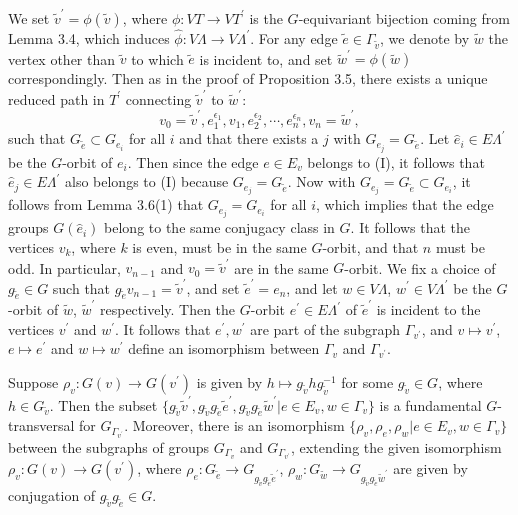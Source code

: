 \documentclass[11pt]{amsart}
\theoremstyle{plain}
\numberwithin{theorem}{section}
\theoremstyle{definition}
\begin{document}
We set $\tilde{v}^\prime=\phi(\tilde{v})$, where $\phi: VT\rightarrow VT^\prime$ is the 
$G$-equivariant bijection coming from Lemma 3.4, which induces 
$\hat{\phi}: V\Lambda\rightarrow V\Lambda^\prime$.
For any edge $\tilde{e}\in \Gamma_{\tilde{v}}$, we denote by
$\tilde{w}$ the vertex other than $\tilde{v}$ to which $\tilde{e}$ is incident to, and set 
$\tilde{w}^\prime=\phi(\tilde{w})$ correspondingly. Then as in the proof of Proposition 3.5,
there exists a unique reduced path in $T^\prime$ connecting $\tilde{v}^\prime$ to $\tilde{w}^\prime$:
$$
v_0=\tilde{v}^\prime, e_1^{\epsilon_1}, v_1, e_2^{\epsilon_2}, \cdots, e_n^{\epsilon_n}, v_n=\tilde{w}^\prime, 
$$
such that $G_{\tilde{e}}\subset G_{e_i}$ for all $i$ and that there exists a $j$ with 
$G_{e_j}=G_{\tilde{e}}$.  Let $\hat{e}_i\in E\Lambda^\prime$ be the $G$-orbit of $e_i$. 
Then since the edge $e\in E_v$ belongs to (I), it follows that $\hat{e}_j\in E\Lambda^\prime$ also belongs to (I) because $G_{e_j}=G_{\tilde{e}}$.
Now with $G_{e_j}=G_{\tilde{e}}\subset G_{e_i}$, it follows from Lemma 3.6(1) that 
$G_{e_j}=G_{e_i}$ for all $i$, which implies that the edge groups $G(\hat{e}_i)$ belong to 
the same conjugacy class in $G$.
It follows that the vertices $v_k$, where $k$ is even, must be in the same $G$-orbit, 
and that $n$ must be odd. 
In particular, $v_{n-1}$ and $v_0=\tilde{v}^\prime$ are in the same $G$-orbit. We fix a choice of 
$g_{\tilde{e}}\in G$ such that $g_{\tilde{e}}v_{n-1}=\tilde{v}^\prime$, and set $\tilde{e}^\prime=e_n$, and
let $w\in V\Lambda$, $w^\prime\in V\Lambda^\prime$ be the $G$-orbit of $\tilde{w}$, $\tilde{w}^\prime$
respectively. Then the $G$-orbit $e^\prime\in E\Lambda^\prime$ of $\tilde{e}^\prime$ is incident to the
vertices $v^\prime$ and $w^\prime$. It follows that $e^\prime, w^\prime$ are part of the subgraph 
$\Gamma_{v^\prime}$, and $v\mapsto v^\prime$, $e\mapsto e^\prime$ and $w\mapsto w^\prime$
define an isomorphism between $\Gamma_v$ and $\Gamma_{v^\prime}$.

Suppose $\rho_v: G(v)\rightarrow G(v^\prime)$ is given by 
$h\mapsto g_{\tilde{v}}h g_{\tilde{v}}^{-1}$ for some $g_{\tilde{v}}\in G$, where $h\in G_{\tilde{v}}$.
Then the subset $\{ g_{\tilde{v}} \tilde{v}^\prime, g_{\tilde{v}} g_{\tilde{e}} \tilde{e}^\prime, g_{\tilde{v}} g_{\tilde{e}} \tilde{w}^\prime|e\in E_v, w\in \Gamma_v\}$ is a fundamental  $G$-transversal for 
$G_{\Gamma_{v^\prime}}$. Moreover, there is an isomorphism 
$\{\rho_v, \rho_e,\rho_w|e\in E_v, w\in \Gamma_v\}$ between the subgraphs of groups
$G_{\Gamma_v}$ and $G_{\Gamma_{v^\prime}}$, extending the given isomorphism $\rho_v: G(v)\rightarrow G(v^\prime)$, where 
$\rho_e: G_{\tilde{e}}\rightarrow G_{g_{\tilde{v}} g_{\tilde{e}} \tilde{e}^\prime}$, 
$\rho_w: G_{\tilde{w}}\rightarrow G_{g_{\tilde{v}} g_{\tilde{e}} \tilde{w}^\prime}$
are given by conjugation of $g_{\tilde{v}} g_{\tilde{e}}\in G$. 
\end{document}
